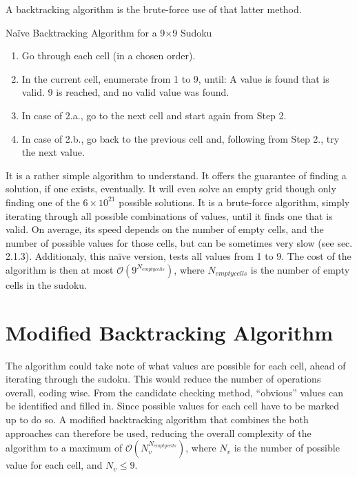 \documentclass[12pt]{report} %
\begin{document}
A backtracking algorithm is the brute-force use of that latter method\cite{cornell_sudoku}.

\begin{definitionbox}{Naïve Backtracking Algorithm for a 9$\times$9 Sudoku}

  \begin{enumerate}
    \item Go through each cell (in a chosen order).
    \item In the current cell, enumerate from 1 to 9, until:
     A value is found that is valid.
     9 is reached, and no valid value was found.
    \item In case of 2.a., go to the next cell and start again from Step 2.
    \item In case of 2.b., go back to the previous cell and, following from Step 2., try the next value.
  \end{enumerate}

\end{definitionbox}

\vspace*{1\baselineskip}
It is a rather simple algorithm to understand. It offers the guarantee of finding a solution, if one exists, eventually. It will even solve an empty grid though only finding one of the $6 \times 10^{21}$ possible solutions\cite{cornell_sudoku3}.
It is a brute-force algorithm, simply iterating through all possible combinations of values, until it finds one that is valid. On average, its speed depends on the number of empty cells, and the number of possible values for those cells, but can be sometimes very slow (see sec. 2.1.3). Additionaly, this naïve version, tests all values from 1 to 9. The cost of the algorithm is then at most $\mathcal{O}(9^{N_{empty cells}})$, where $N_{empty cells}$ is the number of empty cells in the sudoku.

\section{Modified Backtracking Algorithm}

The algorithm could take note of what values are possible for each cell, ahead of iterating through the sudoku. This would reduce the number of operations overall, coding wise.
From the candidate checking method, ``obvious'' values can be identified and filled in. Since possible values for each cell have to be marked up to do so. A modified backtracking algorithm that combines the both approaches can therefore be used, reducing the overall complexity of the algorithm to a maximum of $\mathcal{O}(N_{v}^{N_{empty cells}})$, where $N_{v}$ is the number of possible value for each cell, and $N_{v}\leq 9$.
\end{document}
